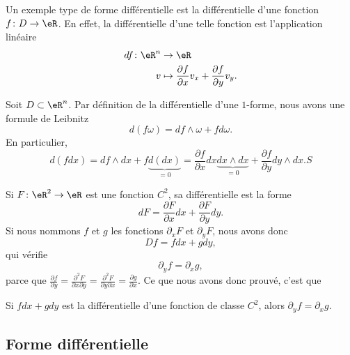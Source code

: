 \begin{example}
    Un exemple type de forme différentielle est la différentielle d'une fonction $f\colon D\to \eR$. En effet, la différentielle d'une telle fonction est l'application linéaire
    \begin{equation}
        \begin{aligned}
            df\colon \eR^n&\to \eR \\
            v&\mapsto \frac{ \partial f }{ \partial x }v_x+\frac{ \partial f }{ \partial y }v_y. 
        \end{aligned}
    \end{equation}
\end{example}

Soit $D\subset\eR^n$. Par définition de la différentielle d'une $1$-forme, nous avons une formule de Leibnitz
\begin{equation}
    d(f\omega)=df\wedge\omega+fd\omega.
\end{equation}
En particulier,
\begin{equation}
    d(fdx)=df\wedge dx+f\underbrace{d(dx)}_{=0}=\frac{ \partial f }{ \partial x }dx\underbrace{dx\wedge dx}_{=0}+\frac{ \partial f }{ \partial y }dy\wedge dx. S
\end{equation}

Si $F\colon \eR^2\to \eR$ est une fonction $C^2$, sa différentielle est la forme
\begin{equation}
    dF=\frac{ \partial F }{ \partial x }dx+\frac{ \partial F }{ \partial y }dy.
\end{equation}
Si nous nommons $f$ et $g$ les fonctions $\partial_xF$ et $\partial_yF$, nous avons donc
\begin{equation}
    Df=fdx+gdy,
\end{equation}
qui vérifie
\begin{equation}
    \partial_yf=\partial_xg,
\end{equation}
parce que $\frac{ \partial f }{ \partial y }=\frac{ \partial^2F  }{ \partial x\partial y }=\frac{ \partial^2F  }{ \partial y\partial x }=\frac{ \partial g }{ \partial x }$. Ce que nous avons donc prouvé, c'est que 
\begin{lemma}
Si $fdx+gdy$ est la différentielle d'une fonction de classe $C^2$, alors $\partial_yf=\partial_xg$.
\end{lemma}

\subsection{Forme différentielle}

